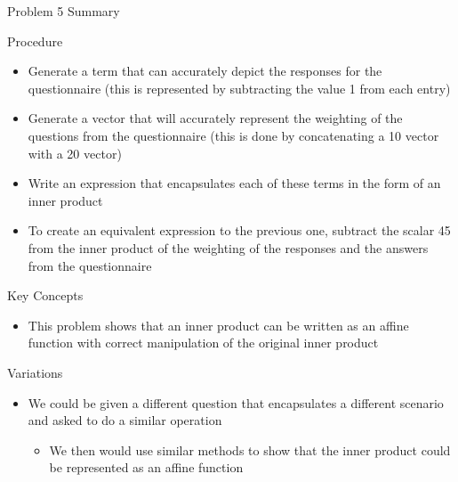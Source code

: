 \begin{summary}{Problem 5 Summary}
    \begin{statement}{Procedure}
        \begin{itemize}
            \item Generate a term that can accurately depict the responses for the questionnaire (this is represented by subtracting the value 1 from each entry)
            \item Generate a vector that will accurately represent the weighting of the questions from the questionnaire (this is done by concatenating a 10 vector with a 20 vector)
            \item Write an expression that encapsulates each of these terms in the form of an inner product
            \item To create an equivalent expression to the previous one, subtract the scalar 45 from the inner product of the weighting of the responses and the answers from the questionnaire
        \end{itemize}
    \end{statement}
    \begin{statement}{Key Concepts}
        \begin{itemize}
            \item This problem shows that an inner product can be written as an affine function with correct manipulation of the original inner product
        \end{itemize}
    \end{statement}
    \begin{statement}{Variations}
        \begin{itemize}
            \item We could be given a different question that encapsulates a different scenario and asked to do a similar operation
            \begin{itemize}
                \item We then would use similar methods to show that the inner product could be represented as an affine function
            \end{itemize}
        \end{itemize}
    \end{statement}
\end{summary}

